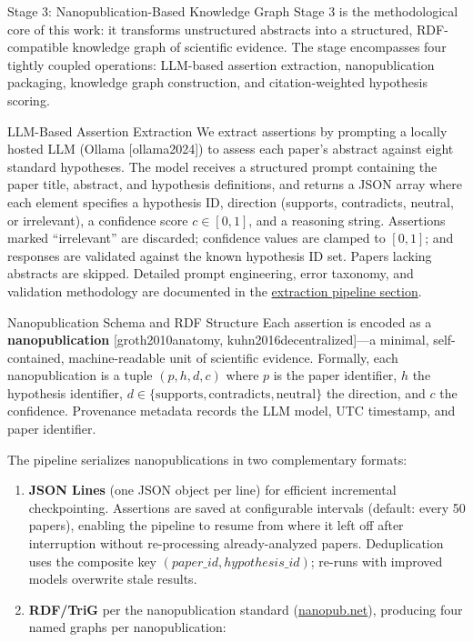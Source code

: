 \documentclass[
  ignorenonframetext,
]{beamer}
\author{\texorpdfstring{}{}}
\date{}
\providecommand{\citep}[1]{[#1]}
\begin{document}
\begin{frame}{Stage 3: Nanopublication-Based
Knowledge Graph \label{sec:methods_kg}}
\protect{}\label{stage-3-nanopublication-based-knowledge-graph}
Stage 3 is the methodological core of this work: it transforms
unstructured abstracts into a structured, RDF-compatible knowledge graph
of scientific evidence. The stage encompasses four tightly coupled
operations: LLM-based assertion extraction, nanopublication packaging,
knowledge graph construction, and citation-weighted hypothesis scoring.

\begin{block}{LLM-Based Assertion Extraction}
\protect{}\label{llm-based-assertion-extraction}
We extract assertions by prompting a locally hosted LLM (Ollama
\citep{ollama2024}) to assess each paper's abstract against eight
standard hypotheses. The model receives a structured prompt containing
the paper title, abstract, and hypothesis definitions, and returns a
JSON array where each element specifies a hypothesis ID, direction
(supports, contradicts, neutral, or irrelevant), a confidence score
\(c \in [0, 1]\), and a reasoning string. Assertions marked
``irrelevant'' are discarded; confidence values are clamped to
\([0, 1]\); and responses are validated against the known hypothesis ID
set. Papers lacking abstracts are skipped. Detailed prompt engineering,
error taxonomy, and validation methodology are documented in the
\hyperref[sec:extraction_pipeline]{extraction pipeline section}.
\end{block}

\begin{block}{Nanopublication Schema and RDF Structure}
\protect{}\label{nanopublication-schema-and-rdf-structure}
Each assertion is encoded as a \textbf{nanopublication}
\citep{groth2010anatomy, kuhn2016decentralized}---a minimal,
self-contained, machine-readable unit of scientific evidence. Formally,
each nanopublication is a tuple \((p, h, d, c)\) where \(p\) is the
paper identifier, \(h\) the hypothesis identifier,
\(d \in \{\text{supports}, \text{contradicts}, \text{neutral}\}\) the
direction, and \(c\) the confidence. Provenance metadata records the LLM
model, UTC timestamp, and paper identifier.

The pipeline serializes nanopublications in two complementary formats:

\begin{enumerate}
\item
  \textbf{JSON Lines} (one JSON object per line) for efficient
  incremental checkpointing. Assertions are saved at configurable
  intervals (default: every 50 papers), enabling the pipeline to resume
  from where it left off after interruption without re-processing
  already-analyzed papers. Deduplication uses the composite key
  \((paper\_id, hypothesis\_id)\); re-runs with improved models
  overwrite stale results.
\item
  \textbf{RDF/TriG} per the nanopublication standard
  (\href{https://nanopub.net/}{nanopub.net}), producing four named
  graphs per nanopublication:
\end{enumerate}


\end{block}
\end{frame}
\end{document}
